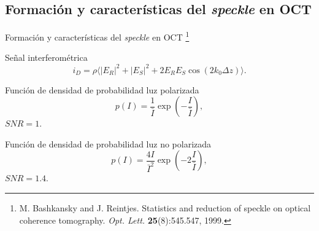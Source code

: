 \documentclass[fleqn,10pt]{beamer}
\newcommand\blfootnote[1]{%
	\begingroup
	\renewcommand\thefootnote{}\footnote{#1}%
	\addtocounter{footnote}{-1}%
	\endgroup
}
\begin{document}
\subsection[Formación y características del \emph{speckle}]{Formación y características del \emph{speckle} en OCT}
\begin{frame}{Formación y características del \emph{speckle} en OCT}
	\vspace*{-0.5cm}
		\blfootnote{{\tiny M. Bashkansky and J. Reintjes. Statistics and reduction of speckle on optical coherence tomography. \emph{Opt. Lett.} \textbf{25}(8):545.547, 1999.}}
	\begin{multicols}{2}{\footnotesize 
		\noindent Señal interferométrica
		 \begin{equation*}
			i_D = \rho \langle\lvert E_R\rvert^2 + \lvert E_S \rvert^2 + 2E_R E_S \cos(2 k_0 \Delta z)\rangle.
			\end{equation*}
		
		\pause
		\noindent Función de densidad de probabilidad luz polarizada
		\begin{equation*}
			p(I) = \frac{1}{\bar{I}} \exp \left(- \frac{I}{\bar{I}}\right),
		\end{equation*}
		$SNR = 1$.\\
		\vspace*{0.5cm}
		
		\noindent Función de densidad de probabilidad luz no polarizada
		\begin{equation*}
			p(I) = \frac{4I}{\bar{I}^2} \exp \left(-2 \frac{I}{\bar{I}}\right),
		\end{equation*}
		$SNR = 1.4$.}
		
		\newpage
		

\end{multicols}
\end{frame}
\end{document}
